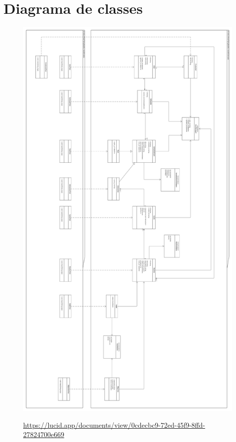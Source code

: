 \chapter{Diagrama de classes}

\begin{figure}[h]
  \centering
  \includegraphics[scale=0.5]{images/diagrams/classes.png}

  \url{https://lucid.app/documents/view/0cdecbc9-72ed-45f9-8ffd-27824700e669}
\end{figure}
